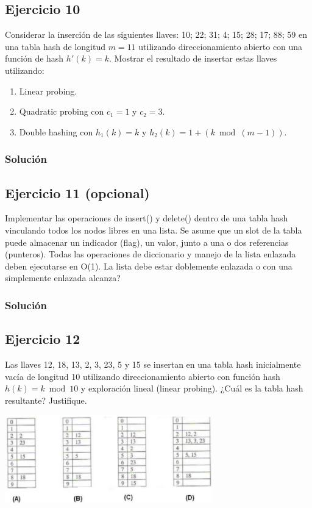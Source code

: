 \documentclass{article}
\begin{document}
\subsection*{Ejercicio 10}
Considerar la inserción de las siguientes llaves: 10; 22; 31; 4; 15; 28; 17; 88; 59 en una tabla hash de longitud $m = 11$ utilizando direccionamiento abierto con una función de hash $h'(k) = k$. Mostrar el resultado de insertar estas llaves utilizando:
\begin{enumerate}
    \item Linear probing.
    \item Quadratic probing con $c_1 = 1$ y $c_2 = 3$.
    \item Double hashing con $h_1(k) = k$ y $h_2(k) = 1 +(k \bmod ( m - 1))$.
\end{enumerate}
\subsubsection*{Solución}


\subsection*{Ejercicio 11 (opcional)}
Implementar las operaciones de insert() y delete() dentro de una tabla hash vinculando todos los nodos libres en una lista. Se asume que un slot de la tabla puede almacenar un indicador (flag), un valor, junto a una o dos referencias (punteros). Todas las operaciones de diccionario y manejo de la lista enlazada deben ejecutarse en O(1). La lista debe estar doblemente enlazada o con una simplemente enlazada alcanza?
\subsubsection*{Solución}


\subsection*{Ejercicio 12}
Las llaves 12, 18, 13, 2, 3, 23, 5 y 15 se insertan en una tabla hash inicialmente vacía de longitud 10 utilizando direccionamiento abierto con función hash $h(k) = k \bmod 10$ y exploración lineal (linear probing). ¿Cuál es la tabla hash resultante? Justifique.

\begin{center}
    \includegraphics*[width=340px]{./img/ej12.png}
\end{center}
\end{document}
